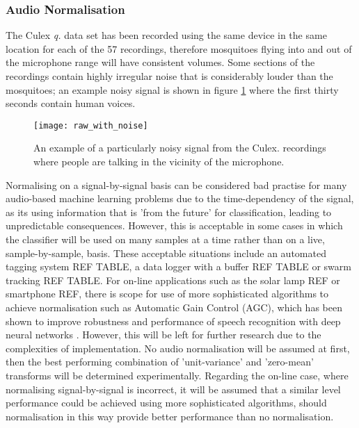         \subsubsection{Audio Normalisation}
        \label{subsubsec:exp-clf-ass-aud}
            The Culex \textit{q.} data set has been recorded using the same device in the same location for each of the 57 recordings, therefore mosquitoes flying into and out of the microphone range will have consistent volumes. Some sections of the recordings contain highly irregular noise that is considerably louder than the mosquitoes; an example noisy signal is shown in figure \ref{fig:exp-clf-audio-noisy} where the first thirty seconds contain human voices.
            \begin{figure}[ht]
                \centering
                \texttt{[image: raw\_with\_noise]}
                \caption{An example of a particularly noisy signal from the Culex. recordings where people are talking in the vicinity of the microphone.}
                \label{fig:exp-clf-audio-noisy}
            \end{figure}
            Normalising on a signal-by-signal basis can be considered bad practise for many audio-based machine learning problems due to the time-dependency of the signal, as its using information that is 'from the future' for classification, leading to unpredictable consequences. However, this is acceptable in some cases in which the classifier will be used on many samples at a time rather than on a live, sample-by-sample, basis. These acceptable situations include an automated tagging system REF TABLE, a data logger with a buffer REF TABLE or swarm tracking REF TABLE. 
            For on-line applications such as the solar lamp REF or smartphone REF, there is scope for use of more sophisticated algorithms to achieve normalisation such as Automatic Gain Control (AGC), which has been shown to improve robustness and performance of speech recognition with deep neural networks \cite{Prabhavalkar2015}. However, this will be left for further research due to the complexities of implementation. No audio normalisation will be assumed at first, then the best performing combination of 'unit-variance' and 'zero-mean' transforms will be determined experimentally. Regarding the on-line case, where normalising signal-by-signal is incorrect, it will be assumed that a similar level performance could be achieved using more sophisticated algorithms, should normalisation in this way provide better performance than no normalisation.

